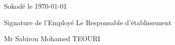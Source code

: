 \documentclass[a4paper, 12pt]{article}
\begin{document}
\begin{flushright}
Sokodé le \today
\end{flushright}\vspace{2mm}



Signature de l'Employé \hspace{6.3cm}  Le Responsable d'établissement


\vspace{1cm}


\begin{minipage}[t]{0.5\textwidth} %
  \raggedright %
   
  \end{minipage} %
  \hfill %
  \begin{minipage}[t]{0.4\textwidth} %
  \raggedleft %
  Mr Sabirou Mohamed TEOURI
    
  \end{minipage} %
\end{document}
